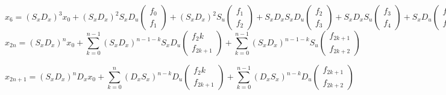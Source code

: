 \documentclass[10pt,a4paper]{article}
\begin{document}
\begin{equation}
x_6=
(S_xD_x)^3x_0+
(S_xD_x)^2S_xD_u\begin{pmatrix} f_0 \\ f_1 \end{pmatrix}+
(S_xD_x)^2S_u\begin{pmatrix} f_1 \\ f_2 \end{pmatrix}+
S_xD_xS_xD_u\begin{pmatrix} f_2 \\ f_3 \end{pmatrix}+
S_xD_xS_u\begin{pmatrix} f_3 \\ f_4 \end{pmatrix}+
S_xD_u\begin{pmatrix} f_4 \\ f_5 \end{pmatrix}
S_u\begin{pmatrix} f_5 \\ f_6 \end{pmatrix}
\end{equation}
\begin{equation}
x_{2n}=
(S_xD_x)^nx_0+
\sum\limits_{k=0}^{n-1}{(S_xD_x)^{n-1-k}}S_xD_u
\begin{pmatrix} f_2k \\ f_{2k+1} \end{pmatrix}+
\sum\limits_{k=0}^{n-1}{(S_xD_x)^{n-1-k}}S_u
\begin{pmatrix} f_{2k+1} \\ f_{2k+2} \end{pmatrix}
\end{equation}

\begin{equation}
x_{2n+1}=
(S_xD_x)^nD_xx_0+
\sum\limits_{k=0}^{n}{(D_xS_x)^{n-k}}D_u
\begin{pmatrix} f_2k \\ f_{2k+1} \end{pmatrix}+
\sum\limits_{k=0}^{n-1}{(D_xS_x)^{n-k}}D_u
\begin{pmatrix} f_{2k+1} \\ f_{2k+2} \end{pmatrix}
\end{equation}
\end{document}
